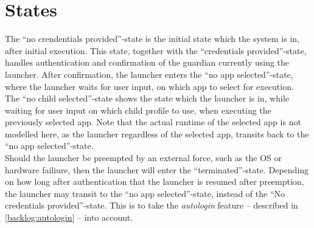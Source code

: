 \section{States}


The ``no crendentials provided''-state is the initial state which the system is in, after initial execution.
This state, together with the ``credentials provided''-state, handles authentication and confirmation of the guardian currently using the launcher.
After confirmation, the launcher enters the ``no app selected''-state, where the launcher waits for user input, on which app to select for execution. \\

The ``no child selected''-state shows the state which the launcher is in, while waiting for user input on which child profile to use, when executing the previously selected app.
Note that the actual runtime of the selected app is not modelled here, as the launcher regardless of the selected app, transits back to the ``no app selected''-state. \\

Should the launcher be preempted by an external force, such as the OS or hardware failiure, then the launcher will enter the ``terminated''-state.
Depending on how long after authentication that the launcher is resumed after preemption, the launcher may transit to the ``no app selected''-state, instead of the ``No credentials provided''-state.
This is to take the \emph{autologin} feature -- described in \autoref{backlog:autologin} -- into account.

